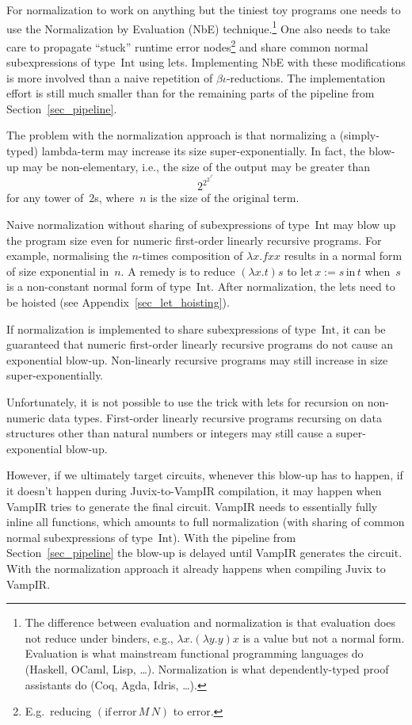 For normalization to work on anything but the tiniest toy programs one
needs to use the Normalization by Evaluation (NbE)
technique.\footnote{The difference between evaluation and
normalization is that evaluation does not reduce under binders, e.g.,
$\lambda x . (\lambda y . y) x$ is a value but not a normal
form. Evaluation is what mainstream functional programming languages
do (Haskell, OCaml, Lisp, \ldots). Normalization is what
dependently-typed proof assistants do (Coq, Agda, Idris, \ldots).} One
also needs to take care to propagate ``stuck'' runtime error
nodes\footnote{E.g.~reducing $(\mathrm{if}\,\mathrm{error}\,M\,N)$ to
$\mathrm{error}$.} and share common normal subexpressions of
type~$\mathrm{Int}$ using lets. Implementing NbE with these
modifications is more involved than a naive repetition of
$\beta\iota$-reductions. The implementation effort
is still much smaller than for the remaining parts of the pipeline
from Section~\ref{sec_pipeline}.

The problem with the normalization approach is that normalizing a
(simply-typed) lambda-term may increase its size
super-exponentially. In fact, the blow-up may be non-elementary, i.e.,
the size of the output may be greater than
\[
2^{2^{2^{\vdots^{2^n}}}}
\]
for any tower of~$2$s, where~$n$ is the size of the original
term.

Naive normalization without sharing of subexpressions of
type~$\mathrm{Int}$ may blow up the program size even for numeric first-order
linearly recursive programs. For example, normalising the $n$-times
composition of $\lambda x . f x x$ results in a normal form of size
exponential in~$n$. A remedy is to reduce $(\lambda x . t) s$ to
$\mathrm{let}\,x:=s\,\mathrm{in}\,t$ when~$s$ is a non-constant normal
form of type~$\mathrm{Int}$. After normalization, the lets need to be
hoisted (see Appendix~\ref{sec_let_hoisting}).

If normalization is implemented to share subexpressions of
type~$\mathrm{Int}$, it can be guaranteed that numeric first-order
linearly recursive programs do not cause an exponential
blow-up. Non-linearly recursive programs may still increase in size
super-exponentially.

Unfortunately, it is not possible to use the trick with lets for
recursion on non-numeric data types. First-order linearly recursive
programs recursing on data structures other than natural numbers or
integers may still cause a super-exponential blow-up.

However, if we ultimately target circuits, whenever this blow-up has
to happen, if it doesn't happen during Juvix-to-VampIR compilation, it
may happen when VampIR tries to generate the final circuit. VampIR
needs to essentially fully inline all functions, which amounts to full
normalization (with sharing of common normal subexpressions of
type~$\mathrm{Int}$). With the pipeline from
Section~\ref{sec_pipeline} the blow-up is delayed until VampIR
generates the circuit. With the normalization approach it already
happens when compiling Juvix to VampIR.

